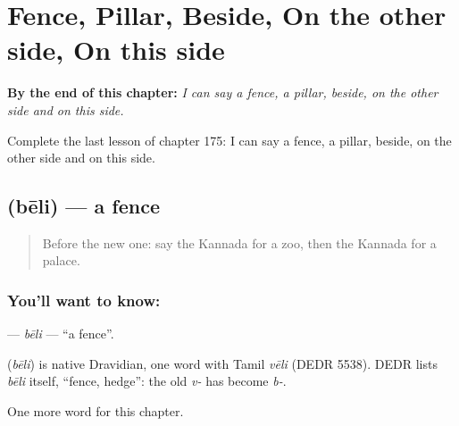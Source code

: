 
\chapter{Fence, Pillar, Beside, On the other side, On this side}
\label{ch:ka-fence-pillar-beside-on-the-other-side-on-this-side}

\begin{chapteropening}
\textbf{By the end of this chapter:} \emph{I can say a fence, a pillar, beside, on the other side and on this side.}

Complete the last lesson of chapter 175: I can say a fence, a pillar, beside, on the other side and on this side.
\end{chapteropening}

\section[\texorpdfstring{\kn{ಬೇಲಿ} (bēli)}{ಬೇಲಿ (bēli)}]{ (bēli) — a fence}

\label{lesson:KA-C175-beli}



\begin{quote}
Before the new one: say the Kannada for a zoo, then the Kannada for a palace.
\end{quote}

\subsection*{You'll want to know: }
\textbf{} — \emph{bēli} — \textquotedblleft{}a fence\textquotedblright{}.

\begin{cousinweb}
\textbf{} (\emph{bēli}) is native Dravidian, one word with Tamil \emph{vēli} (DEDR 5538). DEDR lists \emph{bēli} itself, \textquotedblleft{}fence, hedge\textquotedblright{}: the old \emph{v-} has become \emph{b-}.
\end{cousinweb}

\begin{grammarlens}[title={What you've built}]
One more word for this chapter.
\end{grammarlens}

